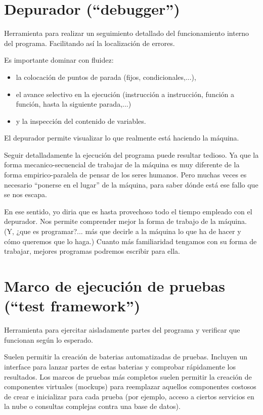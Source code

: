 \documentclass[spanish,12pt,a4paper,final,oneside]{book}
\begin{document}
\section{Depurador (``debugger'')}
Herramienta para realizar un seguimiento detallado del funcionamiento interno del programa. Facilitando así la localización de errores.

Es importante dominar con fluidez:
\begin{itemize}
\item la colocación de puntos de parada (fijos, condicionales,...), 
\item el avance selectivo en la ejecución (instrucción a instrucción, función a función, hasta la siguiente parada,...) 
\item y la inspección del contenido de variables.
\end{itemize}

El depurador permite visualizar lo que realmente está haciendo la máquina. 

Seguir detalladamente la ejecución del programa puede resultar tedioso. Ya que la forma mecanico-secuencial de trabajar de la máquina es muy diferente de la forma empirico-paralela de pensar de los seres humanos. Pero muchas veces es necesario ``ponerse en el lugar'' de la máquina, para saber dónde está ese fallo que se nos escapa.

En ese sentido, yo diria que es hasta provechoso todo el tiempo empleado con el depurador. Nos permite comprender mejor la forma de trabajo de la máquina. (Y, ¿que es programar?... más que decirle a la máquina lo que ha de hacer y cómo queremos que lo haga.) Cuanto más familiaridad tengamos con su forma de trabajar, mejores programas podremos escribir para ella.



\section{Marco de ejecución de pruebas\\(``test framework'')}
Herramienta para ejercitar aisladamente partes del programa y verificar que funcionan según lo esperado.

Suelen permitir la creación de baterias automatizadas de pruebas.  Incluyen un interface para lanzar partes de estas baterias y comprobar rápidamente los resultados. Los marcos de pruebas más completos suelen permitir la creación de componentes virtuales (mockups) para reemplazar aquellos componentes costosos de crear e inicializar para cada prueba (por ejemplo, acceso a ciertos servicios en la nube o consultas complejas contra una base de datos).
\end{document}
